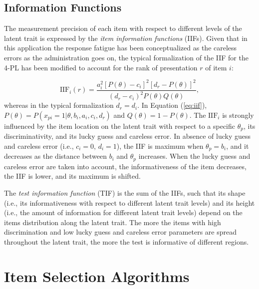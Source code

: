 \documentclass{svproc}
\begin{document}
\subsection{Information Functions}

The measurement precision of each item with respect to different levels of the latent trait is expressed by the \emph{item information functions} (IIFs). 
Given that in this application the response fatigue has been conceptualized as the careless errors as the administration goes on, the typical formalization of the IIF for the 4-PL \cite{magis:iif} has been modified to account for the rank of presentation $r$ of item $i$:


\begin{equation}\label{eq:iif}
	\text{IIF}_{i}(r) = \dfrac{a_i^2[P(\theta)-c_i]^2[d_r - P(\theta)]^2}{(d_{r}-c_i)^2 P(\theta)Q(\theta)}, 
\end{equation}
whereas in the typical formalization $d_r = d_i$. In Equation (\ref{eq:iif}), $P(\theta) = P(x_{pi}=1|\theta, b_i, a_i, c_i, d_r)$  and $Q(\theta) = 1- P(\theta)$.
The $\text{IIF}_i$ is strongly influenced by the item location on the latent trait with respect to a specific $\theta_p$, its discriminativity, and its lucky guess and careless error. In absence of lucky guess and careless error (i.e., $c_i = 0$, $d_i = 1$), the IIF is maximum when  $\theta_p = b_i$, and it decreases as the distance between $b_i$ and $\theta_p$ increases. When the lucky guess and careless error are taken into account, the informativeness of the item decreases, the IIF is lower, and its maximum is shifted. 

The \emph{test information function} (TIF) is the sum of the IIFs, such that its shape (i.e., its informativeness with respect to different latent trait levels) and its height (i.e., the amount of information for different latent trait levels) depend on the items distribution along the latent trait. The more the items with high discrimination and low lucky guess and careless error parameters are spread throughout the latent trait, the more the test is informative of different regions. 


\section{Item Selection Algorithms}
\end{document}
